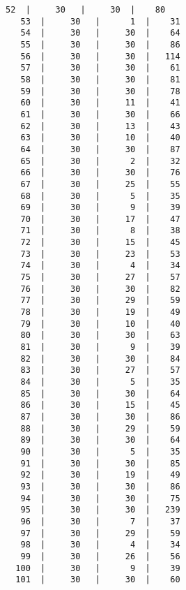 \documentclass[10pt]{article}
\begin{document}
\begin{Verbatim}[fontsize=\small, commandchars=\\\{\}]
   52  |     30   |     30  |    80
   53  |     30   |      1  |    31
   54  |     30   |     30  |    64
   55  |     30   |     30  |    86
   56  |     30   |     30  |   114
   57  |     30   |     30  |    61
   58  |     30   |     30  |    81
   59  |     30   |     30  |    78
   60  |     30   |     11  |    41
   61  |     30   |     30  |    66
   62  |     30   |     13  |    43
   63  |     30   |     10  |    40
   64  |     30   |     30  |    87
   65  |     30   |      2  |    32
   66  |     30   |     30  |    76
   67  |     30   |     25  |    55
   68  |     30   |      5  |    35
   69  |     30   |      9  |    39
   70  |     30   |     17  |    47
   71  |     30   |      8  |    38
   72  |     30   |     15  |    45
   73  |     30   |     23  |    53
   74  |     30   |      4  |    34
   75  |     30   |     27  |    57
   76  |     30   |     30  |    82
   77  |     30   |     29  |    59
   78  |     30   |     19  |    49
   79  |     30   |     10  |    40
   80  |     30   |     30  |    63
   81  |     30   |      9  |    39
   82  |     30   |     30  |    84
   83  |     30   |     27  |    57
   84  |     30   |      5  |    35
   85  |     30   |     30  |    64
   86  |     30   |     15  |    45
   87  |     30   |     30  |    86
   88  |     30   |     29  |    59
   89  |     30   |     30  |    64
   90  |     30   |      5  |    35
   91  |     30   |     30  |    85
   92  |     30   |     19  |    49
   93  |     30   |     30  |    86
   94  |     30   |     30  |    75
   95  |     30   |     30  |   239
   96  |     30   |      7  |    37
   97  |     30   |     29  |    59
   98  |     30   |      4  |    34
   99  |     30   |     26  |    56
  100  |     30   |      9  |    39
  101  |     30   |     30  |    60
\end{Verbatim}

\clearpage
\end{document}

